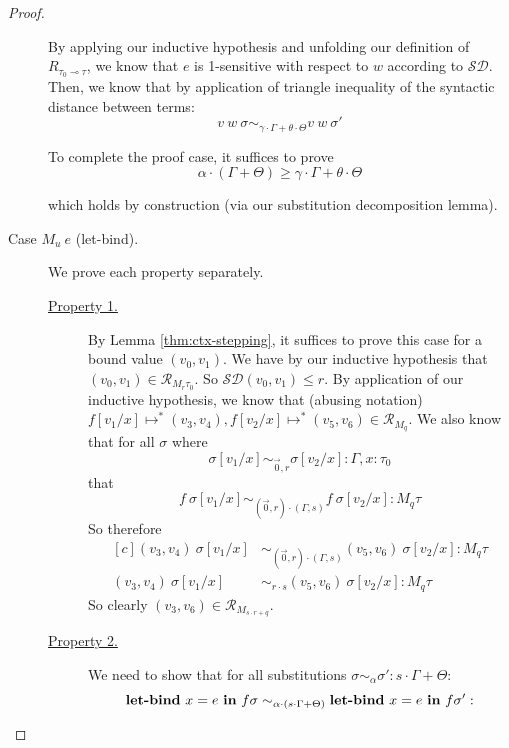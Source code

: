 \begin{proof}
\begin{description}
      By applying our inductive hypothesis and unfolding our definition of
      $R_{\tau_0 \multimap \tau}$, we know that $e$ is 
      1-sensitive with respect to $w$ according to $\mathcal{SD}$. 
      Then, we know that by application of triangle inequality of the syntactic
      distance between terms:
      $$v~w~\sigma \sim_{\gamma \cdot \Gamma + \theta \cdot \Theta} v~w~\sigma'$$

      To complete the proof case, it suffices to prove 
      $$\alpha \cdot (\Gamma + \Theta) \geq \gamma \cdot \Gamma + \theta \cdot \Theta$$

      which holds by construction (via our substitution decomposition lemma).
    \item[Case $M_u~e$ (let-bind).] 
      We prove each property separately.
      \begin{description}
        \item[\underline{Property 1.}]
          By Lemma \ref{thm:ctx-stepping}, it suffices to prove this case for a
          bound value $(v_0, v_1)$. 
          We have by our inductive hypothesis that $(v_0, v_1) \in \mathcal{R}_{M_r
          \tau_0}$. So $\mathcal{SD}(v_0, v_1) \leq r$. By application of our
          inductive hypothesis, we know that (abusing notation) 
          $f[v_1/x] \mapsto^{*} (v_3, v_4), f[v_2/x] \mapsto^{*} (v_5, v_6) \in \mathcal{R}_{M_q}$.
          We also know that for all $\sigma$ where
          $$\sigma[v_1/x] \sim_{\vec{0}, r} \sigma[v_2/x] : \Gamma, x : \tau_0$$
          that
          $$f~\sigma[v_1/x] \sim_{(\vec{0},r) \cdot (\Gamma, s)} f~\sigma[v_2/x] : M_q \tau$$
          So therefore
          \begin{equation}
            \begin{aligned}[c]
              (v_3, v_4)~\sigma[v_1/x] &\sim_{(\vec{0},r) \cdot (\Gamma, s)} (v_5, v_6)~\sigma[v_2/x] : M_q \tau \\
              (v_3, v_4)~\sigma[v_1/x] &\sim_{r \cdot s} (v_5, v_6)~\sigma[v_2/x] : M_q \tau
            \end{aligned}
          \end{equation}
          So clearly $(v_3, v_6) \in \mathcal{R}_{M_{s \cdot r + q}}$.
        \item[\underline{Property 2.}]
          We need to show that for all substitutions $\sigma \sim_{\alpha}
          \sigma' : s \cdot \Gamma + \Theta$:
          $$\textbf{let-bind}~x = e \ \textbf{in} \ f \sigma \sim_{\alpha \cdot (s
          \cdot \Gamma + \Theta)} \textbf{let-bind}~x = e \ \textbf{in} \ f \sigma' :
$$
\end{description}
\end{description}
\end{proof}
